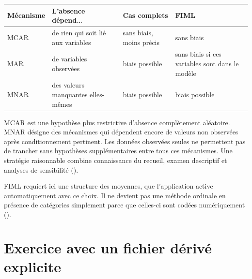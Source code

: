 \documentclass[
  french,
  11pt,
  a4paper,
  DIV=11,
  numbers=noendperiod]{scrreprt}
\newcounter{none} %
\begin{document}
{\def\LTcaptype{none} %
\begin{longtable}[]{@{}
  >{\raggedright\arraybackslash}p{}
  >{\raggedright\arraybackslash}p{}
  >{\raggedright\arraybackslash}p{}
  >{\raggedright\arraybackslash}p{}@{}}
\toprule\noalign{}
\begin{minipage}[b]{\linewidth}\raggedright
Mécanisme
\end{minipage} & \begin{minipage}[b]{\linewidth}\raggedright
L'absence dépend\ldots{}
\end{minipage} & \begin{minipage}[b]{\linewidth}\raggedright
Cas complets
\end{minipage} & \begin{minipage}[b]{\linewidth}\raggedright
FIML
\end{minipage} \\
\midrule\noalign{}
\endhead
\bottomrule\noalign{}
\endlastfoot
MCAR & de rien qui soit lié aux variables & sans biais, moins précis &
sans biais \\
MAR & de variables observées & biais possible & sans biais si ces
variables sont dans le modèle \\
MNAR & des valeurs manquantes elles-mêmes & biais possible & biais
possible \\
\end{longtable}
}

MCAR est une hypothèse plus restrictive d'absence complètement
aléatoire. MNAR désigne des mécanismes qui dépendent encore de valeurs
non observées après conditionnement pertinent. Les données observées
seules ne permettent pas de trancher sans hypothèses supplémentaires
entre tous ces mécanismes. Une stratégie raisonnable combine
connaissance du recueil, examen descriptif et analyses de sensibilité
().

FIML requiert ici une structure des moyennes, que l'application active
automatiquement avec ce choix. Il ne devient pas une méthode ordinale en
présence de catégories simplement parce que celles-ci sont codées
numériquement ().

\section{Exercice avec un fichier dérivé
explicite}\label{exercice-avec-un-fichier-duxe9rivuxe9-explicite}
\end{document}

